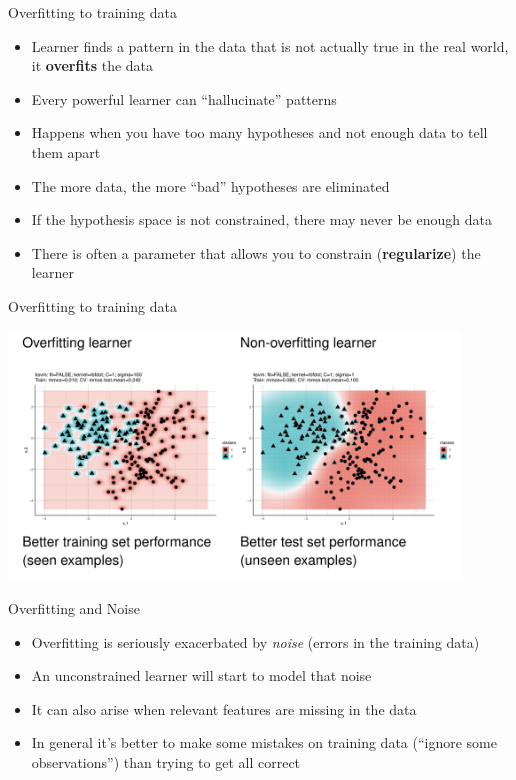 \begin{frame}{Overfitting to training data}
\begin{itemize}
\item Learner finds a pattern in the data that is not actually true in the real world, it \textbf{overfits} the data
\item Every powerful learner can \enquote{hallucinate} patterns
\item Happens when you have too many hypotheses and not enough data to tell them apart
\item The more data, the more \enquote{bad} hypotheses are eliminated
\item If the hypothesis space is not constrained, there may never be enough data
\item There is often a parameter that allows you to constrain (\textbf{regularize}) the learner
\end{itemize}
\end{frame}


\begin{frame}{Overfitting to training data}

\begin{center}
\includegraphics[width=12cm]{plots/overfitting.png}
\end{center}
\end{frame}


\begin{frame}{Overfitting and Noise}
\begin{itemize}
\item Overfitting is seriously exacerbated by \emph{noise} (errors in the training data)
\item An unconstrained learner will start to model that noise
\item It can also arise when relevant features are missing in the data
\item In general it's better to make some mistakes on training data (\enquote{ignore some observations}) than trying to get all correct
\end{itemize}
\end{frame}



